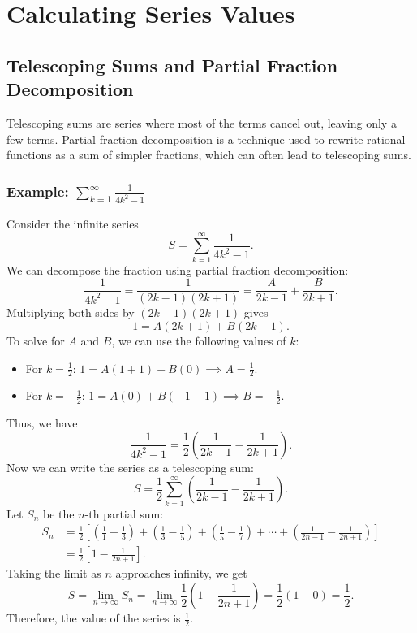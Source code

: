 \section{Calculating Series Values}
\subsection{Telescoping Sums and Partial Fraction Decomposition}
Telescoping sums are series where most of the terms cancel out, leaving only a few terms. Partial fraction decomposition is a technique used to rewrite rational functions as a sum of simpler fractions, which can often lead to telescoping sums.

\subsubsection{Example: \(\sum_{k=1}^{\infty} \frac{1}{4k^2 - 1}\)}
Consider the infinite series
\[
S = \sum_{k=1}^{\infty} \frac{1}{4k^2 - 1}.
\]
We can decompose the fraction using partial fraction decomposition:
\[
\frac{1}{4k^2 - 1} = \frac{1}{(2k - 1)(2k + 1)} = \frac{A}{2k - 1} + \frac{B}{2k + 1}.
\]
Multiplying both sides by \((2k - 1)(2k + 1)\) gives
\[
1 = A(2k + 1) + B(2k - 1).
\]
To solve for \(A\) and \(B\), we can use the following values of \(k\):
\begin{itemize}
    \item For \(k = \frac{1}{2}\): \(1 = A(1 + 1) + B(0) \implies A = \frac{1}{2}\).
    \item For \(k = -\frac{1}{2}\): \(1 = A(0) + B(-1 - 1) \implies B = -\frac{1}{2}\).
\end{itemize}
Thus, we have
\[
\frac{1}{4k^2 - 1} = \frac{1}{2} \left( \frac{1}{2k - 1} - \frac{1}{2k + 1} \right).
\]
Now we can write the series as a telescoping sum:
\[
S = \frac{1}{2} \sum_{k=1}^{\infty} \left( \frac{1}{2k - 1} - \frac{1}{2k + 1} \right).
\]
Let \(S_n\) be the \(n\)-th partial sum:
\begin{align*}
S_n &= \frac{1}{2} \left[ \left( \frac{1}{1} - \frac{1}{3} \right) + \left( \frac{1}{3} - \frac{1}{5} \right) + \left( \frac{1}{5} - \frac{1}{7} \right) + \cdots + \left( \frac{1}{2n - 1} - \frac{1}{2n + 1} \right) \right] \\
&= \frac{1}{2} \left[ 1 - \frac{1}{2n + 1} \right].
\end{align*}
Taking the limit as \(n\) approaches infinity, we get
\[
S = \lim_{n \to \infty} S_n = \lim_{n \to \infty} \frac{1}{2} \left( 1 - \frac{1}{2n + 1} \right) = \frac{1}{2} (1 - 0) = \frac{1}{2}.
\]
Therefore, the value of the series is \(\frac{1}{2}\).

\newpage